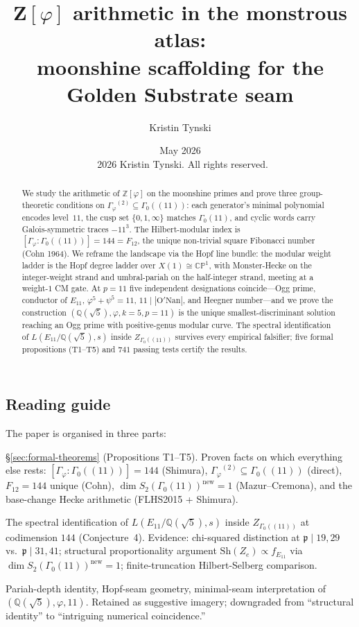 \documentclass[11pt,a4paper]{article}
\title{Z$[\varphi]$ arithmetic in the monstrous atlas:\\
moonshine scaffolding for the Golden Substrate seam}
\author{Kristin Tynski}
\date{May 2026 \\[6pt] {\small\textcopyright\ 2026 Kristin Tynski. All rights reserved.}}
\theoremstyle{plain}
\theoremstyle{definition}
\theoremstyle{remark}
\numberwithin{equation}{section}
\providecommand{\Zp}{\ensuremath{\mathbb{Z}[\varphi]}}
\providecommand{\Qp}{\ensuremath{\mathbb{Q}(\sqrt{5})}}
\providecommand{\Gphi}{\ensuremath{\Gamma_{\varphi}}}
\begin{document}
\maketitle

\begin{abstract}
We study the arithmetic of $\Zp$ on the moonshine primes and prove three
group-theoretic conditions on $\Gphi^{(2)}\subseteq\Gamma_{0}((11))$: each
generator's minimal polynomial encodes level~$11$, the cusp set
$\{0,1,\infty\}$ matches $\Gamma_{0}(11)$, and cyclic words carry
Galois-symmetric traces $-11^{3}$.  The Hilbert-modular index is
$[\Gphi:\Gamma_{0}((11))]=144=F_{12}$, the unique non-trivial square
Fibonacci number (Cohn 1964).  We reframe the landscape via the Hopf line
bundle: the modular weight ladder is the Hopf degree ladder over
$X(1)\cong\mathbb{CP}^{1}$, with Monster-Hecke on the integer-weight strand
and umbral-pariah on the half-integer strand, meeting at a weight-$1$ CM gate.
At $p=11$ five independent designations coincide---Ogg prime, conductor of
$E_{11}$, $\varphi^{5}+\psi^{5}=11$, $11\mid|\mathrm{O'\!Nan}|$, and Heegner
number---and we prove the construction $(\Qp,\varphi,k{=}5,p{=}11)$ is the
unique smallest-discriminant solution reaching an Ogg prime with positive-genus
modular curve.  The spectral identification of $L(E_{11}/\Qp,s)$ inside
$Z_{\Gamma_{0}((11))}$ survives every empirical falsifier; five formal
propositions (T1--T5) and $741$ passing tests certify the results.
\end{abstract}

\subsection*{Reading guide}

The paper is organised in three parts:
\begin{description}\setlength{\itemsep}{0pt}
\item[Part I: Theorems.]  §\ref{sec:formal-theorems} (Propositions T1--T5).
Proven facts on which everything else rests:
$[\Gphi:\Gamma_{0}((11))]=144$ (Shimura), $\Gphi^{(2)}\subseteq\Gamma_{0}((11))$
(direct), $F_{12}=144$ unique (Cohn), $\dim S_{2}(\Gamma_{0}(11))^{\mathrm{new}}=1$
(Mazur--Cremona), and the base-change Hecke arithmetic (FLHS2015 + Shimura).
\item[Part II: Conjectures with strongest evidence.]  The spectral
identification of $L(E_{11}/\Qp,s)$ inside $Z_{\Gamma_{0}((11))}$ at
codimension $144$ (Conjecture~4).
Evidence: chi-squared distinction at $\mathfrak p\mid 19,29$ vs.\
$\mathfrak p\mid 31,41$; structural proportionality argument
$\mathrm{Sh}(Z_{e}) \propto f_{E_{11}}$ via $\dim S_{2}(\Gamma_{0}(11))^{\mathrm{new}}=1$;
finite-truncation Hilbert-Selberg comparison.
\item[Part III: Speculative.]  Pariah-depth identity, Hopf-seam geometry,
minimal-seam interpretation of $(\Qp,\varphi,11)$.  Retained as suggestive
imagery; downgraded from ``structural identity'' to
``intriguing numerical coincidence.''
\end{description}
\end{document}
